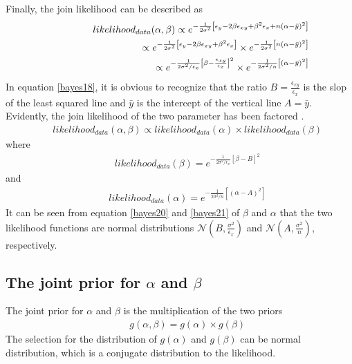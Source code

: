 Finally, the join likelihood can be described as
\begin{eqnarray}
&& likelihood_{data}(\alpha,\beta) \propto e^{-\frac{1}{2\sigma^2}\left[\epsilon_y -2\beta\epsilon_{xy}+\beta^2 \epsilon_x+n(\alpha-\bar y)^2\right]}\label{bayes16}\\
&& \hspace{30mm} \propto e^{-\frac{1}{2\sigma^2}\left[\epsilon_y -2\beta\epsilon_{xy}+\beta^2 \epsilon_x\right]}\times e^{-\frac{1}{2\sigma^2}\left[n(\alpha-\bar y)^2\right]} \label{bayes17}\\
&& \hspace{30mm} \propto e^{-\frac{1}{2\sigma^2/{\epsilon_x}}\left[\beta - \frac{\epsilon_{xy}}{\epsilon_x}\right]^2}\times e^{-\frac{1}{2\sigma^2/n}\left[(\alpha-\bar y)^2\right]} \label{bayes18}
\end{eqnarray}
In equation \eqref{bayes18}, it is obvious to recognize that the ratio $B=\frac{\epsilon_{xy}}{\epsilon_x}$ is the slop of the least squared line and $\bar y$ is the intercept of the vertical line $A=\bar y$. Evidently, the join likelihood of the two parameter has been factored .
\begin{eqnarray}
&& likelihood_{data}(\alpha,\beta) \propto likelihood_{data}(\alpha)\times likelihood_{data}(\beta) \label{bayes19}
\end{eqnarray}
where\\
\begin{eqnarray}
 && likelihood_{data}(\beta) = e^{-\frac{1}{2\sigma^2/{\epsilon_x}}\left[\beta - B\right]^2}  \label{bayes20}
\end{eqnarray}
and
\begin{eqnarray}
 && likelihood_{data}(\alpha) = e^{-\frac{1}{2\sigma^2/n}\left[(\alpha-A)^2\right]} \label{bayes21}
\end{eqnarray}
It can be seen from equation \eqref{bayes20} and \eqref{bayes21} of $\beta$ and $\alpha$ that the two likelihood functions are normal distributions $\mathcal{N}(B,\frac{\sigma^2}{\epsilon_x})$ and $\mathcal{N}(A,\frac{\sigma^2}{n})$, respectively.

\subsection{The joint prior for $\alpha$ and $\beta$}
The joint prior for $\alpha$ and $\beta$ is the multiplication of the two priors
\begin{eqnarray}
 && g(\alpha,\beta) = g(\alpha)\times g(\beta) \label{bayes22}
\end{eqnarray}
The selection for the distribution of $g(\alpha)$ and $g(\beta)$ can be normal distribution, which is a conjugate distribution to the likelihood.
